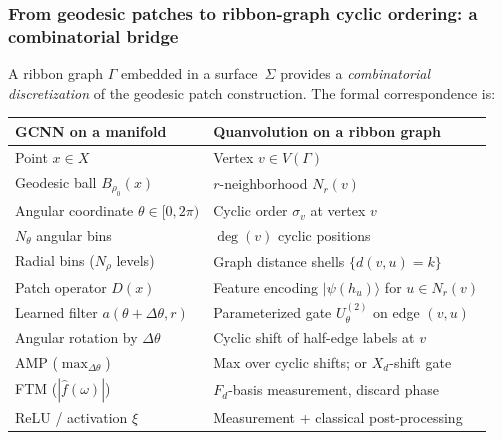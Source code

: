 \documentclass[11pt,oneside]{amsbook}
\numberwithin{equation}{section}
\theoremstyle{plain}
\theoremstyle{definition}
\theoremstyle{remark}
\newcommand{\ket}[1]{\lvert #1 \rangle}
\begin{document}
\subsubsection{From geodesic patches to ribbon-graph cyclic ordering: a combinatorial bridge}
\label{subsubsec:gcnn_to_ribbon}

A ribbon graph $\Gamma$ embedded in a surface~$\Sigma$ provides a \emph{combinatorial discretization} of the geodesic patch construction.  The formal correspondence is:

\begin{center}
\renewcommand{\arraystretch}{1.2}
\begin{tabular}{l@{\qquad$\longleftrightarrow$\qquad}l}
\toprule
\textbf{GCNN on a manifold} & \textbf{Quanvolution on a ribbon graph} \\
\midrule
Point $x\in X$ & Vertex $v\in V(\Gamma)$ \\
Geodesic ball $B_{\rho_0}(x)$ & $r$-neighborhood $N_r(v)$ \\
Angular coordinate $\theta\in[0,2\pi)$ & Cyclic order $\sigma_v$ at vertex $v$ \\
$N_\theta$ angular bins & $\deg(v)$ cyclic positions \\
Radial bins ($N_\rho$ levels) & Graph distance shells $\{d(v,u)=k\}$ \\
Patch operator $D(x)$ & Feature encoding $\ket{\psi(h_u)}$ for $u\in N_r(v)$\\
Learned filter $a(\theta+\Delta\theta,r)$ & Parameterized gate $U_\theta^{(2)}$ on edge $(v,u)$ \\
Angular rotation by $\Delta\theta$ & Cyclic shift of half-edge labels at $v$ \\
AMP ($\max_{\Delta\theta}$) & Max over cyclic shifts; or $X_d$-shift gate \\
FTM ($|\hat f(\omega)|$) & $F_d$-basis measurement, discard phase \\
ReLU / activation $\xi$ & Measurement + classical post-processing \\
\bottomrule
\end{tabular}
\end{center}
\end{document}
